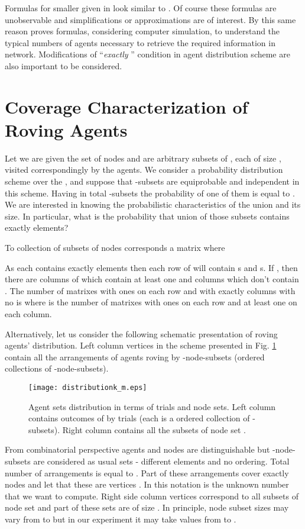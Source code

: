 \documentclass[conference]{IEEEtran}
\begin{document}
Formulas for smaller  given in \cite{irarandomagents} look similar to . Of course these formulas are unobservable and simplifications or approximations are of interest. By this same reason \cite{irarandomagents} proves formulas, considering computer simulation, to understand the typical numbers of agents necessary to retrieve the required information in network. Modifications of ``\textit{exactly} '' condition in agent distribution scheme are also important to be considered.

\section{Coverage Characterization of Roving Agents}
Let we are given the set  of nodes and  are  arbitrary subsets of , each of size , visited correspondingly by the  agents. We consider a probability distribution scheme over the , and suppose that  -subsets  are equiprobable and independent in this scheme. Having in total  -subsets the probability of one of them is equal to . We are interested in knowing the probabilistic characteristics of the union  and its size. In particular, what is the probability that union of those subsets contains exactly  elements?


To collection of subsets  of  nodes corresponds a matrix  where


As each  contains exactly  elements then each row of  will contain  s and  s. If , then there are  columns of  which contain at least one  and  columns which don't contain . The number of  matrixes with  ones on each row and with exactly  columns with no  is  where  is the number of  matrixes with  ones on each row and at least one  on each column. 

Alternatively, let us consider the following schematic presentation of roving agents' distribution. 
Left column vertices in the scheme presented in Fig. \ref{fig:distributionk_m} contain all the arrangements  of  agents roving by  -node-subsets (ordered collections of  -node-subsets).
\begin{figure}[tb]
\begin{center}
\begin{minipage}[h]{\linewidth}  
\texttt{[image: distributionk\_m.eps]}
\end{minipage}
\end{center}
\caption{Agent sets distribution in terms of trials and node sets. Left column contains outcomes of  by  trials (each  is a ordered collection of  -subsets). Right column contains all the subsets of node set .}
\label{fig:distributionk_m}
\end{figure}
From combinatorial perspective agents and nodes are distinguishable but -node-subsets are considered as usual sets - different elements and no ordering. Total number of arrangements is equal to . Part of these arrangements cover exactly  nodes and let that these are vertices . In this notation  is the unknown number that we want to compute. Right side column vertices correspond to all subsets of node set  and part of these sets are of size . In principle, node subset sizes may vary from  to  but in our experiment it may take values from  to .
\end{document}
